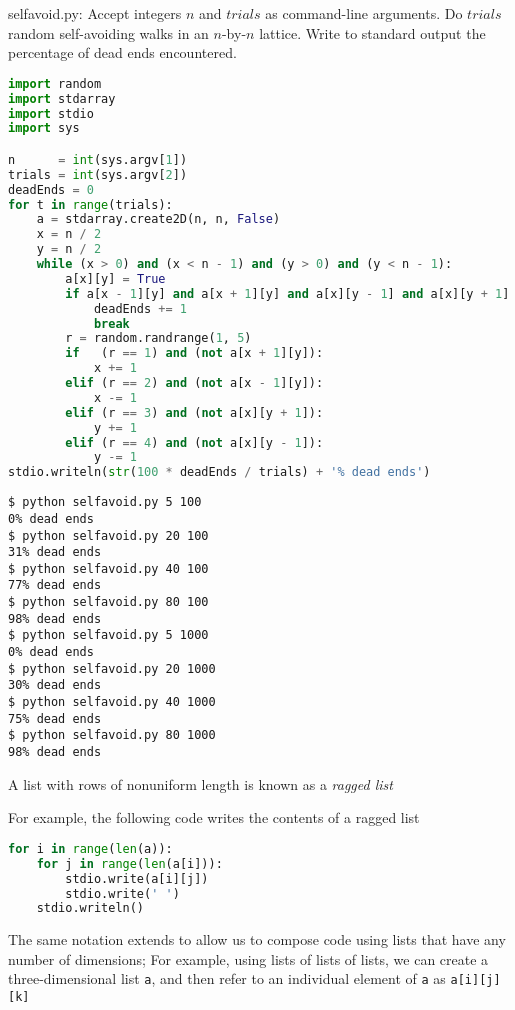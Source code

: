 \documentclass[8pt,a4paper,compress]{beamer}
\begin{document}
\begin{frame}[fragile]
\begin{framed}
\tiny selfavoid.py: Accept integers $n$ and $trials$ as command-line arguments. Do $trials$ random self-avoiding walks in an $n$-by-$n$ lattice. Write to standard output the percentage of dead ends encountered.
\end{framed}

\begin{lstlisting}[language=Python]
import random
import stdarray
import stdio
import sys

n      = int(sys.argv[1])
trials = int(sys.argv[2])
deadEnds = 0
for t in range(trials):
    a = stdarray.create2D(n, n, False)
    x = n / 2
    y = n / 2
    while (x > 0) and (x < n - 1) and (y > 0) and (y < n - 1):
        a[x][y] = True
        if a[x - 1][y] and a[x + 1][y] and a[x][y - 1] and a[x][y + 1]:
            deadEnds += 1
            break
        r = random.randrange(1, 5)
        if   (r == 1) and (not a[x + 1][y]):
            x += 1
        elif (r == 2) and (not a[x - 1][y]):
            x -= 1
        elif (r == 3) and (not a[x][y + 1]):
            y += 1
        elif (r == 4) and (not a[x][y - 1]):
            y -= 1
stdio.writeln(str(100 * deadEnds / trials) + '% dead ends')
\end{lstlisting}
\end{frame}

\begin{frame}[fragile]
\begin{lstlisting}[language={}]
$ python selfavoid.py 5 100
0% dead ends
$ python selfavoid.py 20 100
31% dead ends
$ python selfavoid.py 40 100
77% dead ends
$ python selfavoid.py 80 100
98% dead ends
$ python selfavoid.py 5 1000
0% dead ends
$ python selfavoid.py 20 1000
30% dead ends
$ python selfavoid.py 40 1000
75% dead ends
$ python selfavoid.py 80 1000
98% dead ends
\end{lstlisting}
\end{frame}

\begin{frame}[fragile]
A list with rows of nonuniform length is known as a \emph{ragged list}

\bigskip

For example, the following code writes the contents of a ragged list

\begin{lstlisting}[language=Python]
for i in range(len(a)):
    for j in range(len(a[i])):
        stdio.write(a[i][j])
        stdio.write(' ')
    stdio.writeln()
\end{lstlisting}

\bigskip

The same notation extends to allow us to compose code using lists that have any number of dimensions; For example, using lists of lists of lists, we can create a three-dimensional list \lstinline{a}, and then refer to an individual element of \lstinline{a} as \lstinline{a[i][j][k]}
\end{frame}
\end{document}
